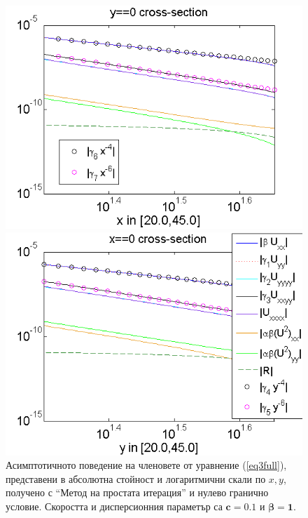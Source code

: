 \documentclass{article}
\newcommand{\rf}[1]{(\ref{#1})}
\theoremstyle{remark}
\begin{document}
\FloatBarrier
\begin{figure}[ht]
	\begin{minipage}[b]{0.95\linewidth}
		\raggedleft
		\includegraphics[width=\linewidth]{AssymptForEachTerm/bt1_c010_090/ChristovIC_AlongX_50_ZB2_bt1_c010_h020_O(h^6).png}
	\end{minipage}
	\begin{minipage}[b]{0.95\linewidth}
		 \raggedright
		\includegraphics[width=\linewidth]{AssymptForEachTerm/bt1_c010_090/ChristovIC_AlongY_50_ZB2_bt1_c010_h020_O(h^6).png}
	\end{minipage}
	\caption{Асимптотичното поведение на членовете от уравнение \rf{eq3full}, представени в абсолютна стойност и логаритмични скали по $x,y$, получено с ``Метод на простата итерация'' и нулево гранично условие. Скоростта и дисперсионния параметър са $\boldsymbol{c=0.1}$ и $\boldsymbol{\beta = 1}$. }
	\label{fig:assympt_beta1c01}
\end{figure}
\FloatBarrier
\end{document}
